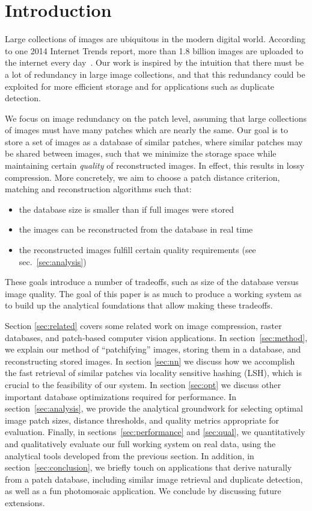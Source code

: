 \section{Introduction}

Large collections of images are ubiquitous in the modern digital world.
According to one 2014 Internet Trends report,
more than 1.8 billion images are uploaded to the internet every day~\cite{meeker2014internet}.
Our work is inspired by the intuition that there must be a lot of redundancy
in large image collections, and that this redundancy could
be exploited for more efficient storage and for applications such as duplicate detection.

We focus on image redundancy on the patch level, assuming that large collections
of images must have many patches which are nearly the same.
Our goal is to store a set of images as a database of
similar patches, where similar patches may be shared between images,
 such that we minimize the storage space while maintaining certain \emph{quality}
of reconstructed images. In effect, this results in lossy compression. More concretely,
we aim to choose a patch distance criterion, matching and reconstruction algorithms such
that:
\begin{itemize}
\item the database size is smaller than if full images were stored
\item the images can be reconstructed from the database in real time
\item the reconstructed images fulfill certain quality requirements (see sec.~\ref{sec:analysis})
\end{itemize}
These goals introduce a number of tradeoffs, such as size of
the database versus image quality.
The goal of this paper is as much to produce a working system as to
build up the analytical foundations that allow making these tradeoffs.

Section \ref{sec:related} covers some related work on image compression, raster databases, and patch-based computer vision applications.
In section~\ref{sec:method}, we explain our method of ``patchifying'' images,
storing them in a database, and reconstructing stored images. 
In section \ref{sec:nn} we discuss how we accomplish the fast retrieval of similar patches via locality sensitive hashing (LSH), which is crucial to the feasibility of our system. In section \ref{sec:opt} we discuss other important database optimizations required for performance. 
In section~\ref{sec:analysis}, we provide the analytical groundwork for
selecting optimal image patch sizes, distance thresholds, and quality metrics
appropriate for evaluation. Finally, in sections~\ref{sec:performance} and \ref{sec:qual},
we quantitatively and qualitatively evaluate our full working system on real data, using the analytical tools developed from the previous section. 
In addition, in section~\ref{sec:conclusion}, we briefly touch on applications that derive naturally
from a patch database, including similar image retrieval and duplicate detection, as well as a fun photomosaic application. We conclude by discussing future extensions.
